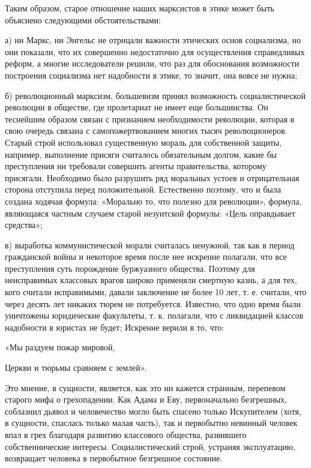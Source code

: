 Таким образом, старое отношение наших марксистов в этике может быть
объяснено следующими обстоятельствами:

а) ни Маркс, ни Энгельс не отрицали важности этических основ
социализма, но они показали, что их совершенно недостаточно для
осуществления справедливых реформ, а многие исследователи решили, что
раз для обоснования возможности построения социализма нет надобности в
этике, то значит, она вовсе не нужна;

б) революционный марксизм, большевизм принял возможность
социалистической революции в обществе, где пролетариат не имеет еще
большинства. Он теснейшим образом связан с признанием необходимости
революции, которая в свою очередь связана с самопожертвованием многих
тысяч революционеров. Старый строй использовал существенную мораль для
собственной защиты, например, выполнение присяги считалось
обязательным долгом, какие бы преступления ни требовали совершить
агенты правительства, которому присягали. Необходимо было разрушить
ряд моральных устоев и отрицательная сторона отступила перед
положительной. Естественно поэтому, что и была создана ходячая
формула: «Морально то, что полезно для революции», формула, являющаяся
частным случаем старой иезуитской формулы: «Цель оправдывает
средства»;

в) выработка коммунистической морали считалась ненужной, так как в
период гражданской войны и некоторое время после нее искренне
полагали, что все преступления суть порождение буржуазного общества.
Поэтому для неисправимых классовых врагов широко применяли смертную
казнь, а для тех, кого считали исправимыми, давали заключение не более
10 лет, т. е. считали, что через десять лет никаких тюрем не
потребуется. Известно, что одно время были уничтожены юридические
факультеты, т. к. полагали, что с ликвидацией классов надобности в
юристах не будет; Искренне верили в то, что:



«Мы раздуем пожар мировой,

Церкви и тюрьмы сравняем с землей».



Это мнение, в сущности, является, как это ни кажется странным,
перепевом старого мифа о грехопадении. Как Адама и Еву, первоначально
безгрешных, соблазнил дьявол и человечество могло быть спасено только
Искупителем (хотя, в сущности, спаслась только малая часть), так и
первобытно невинный человек впал в грех благодаря развитию классового
общества, развившего собственнические интересы. Социалистический
строй, устраняя эксплуатацию, возвращает человека в первобытное
безгрешное состояние.

